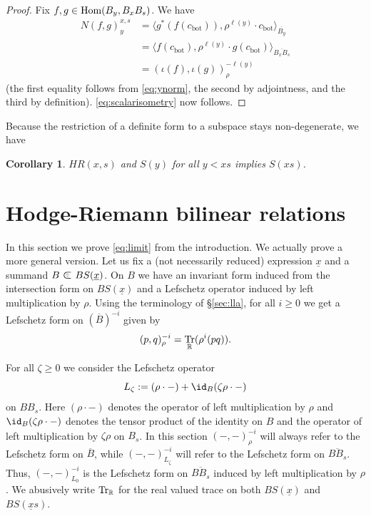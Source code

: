 \documentclass[11pt]{amsart}
\numberwithin{equation}{section}
\def\z{\zeta}
\def\bot{{\mathrm{bot}}}
\DeclareMathOperator{\Tr}{Tr}
\def\ov{\overline}
\def\un{\underline}
\def\summand{
\mathbin{\tikz [baseline=-3pt]
{
\clip (-0.2,-0.15) rectangle (0.2,0.15);
\node[scale=1.2] at (0,0) {$\subset$}; \node[scale=0.5] at
  (0,0) {$\oplus$}; }}
}
\newtheorem{cor}[thm]{Corollary}
\theoremstyle{definition}
\theoremstyle{remark}
\begin{document}
\begin{proof}
Fix $f, g \in \operatorname{Hom}(B_y, B_xB_s)$. We have
\begin{align*}
N(f,g)_y^{x,s} & = \langle g^* ( f (c_\bot)), \rho^{\ell(y)} \cdot c_\bot \rangle_{\ov{B_y}} \\ & =
\langle f (c_\bot), \rho^{\ell(y)} \cdot  g(c_\bot) \rangle_{\ov{B_x B_s}} \\ & = (\iota(f), \iota(g))_\rho^{-\ell(y)} \end{align*} (the first equality follows from
\eqref{eq:ynorm}, the second by adjointness, and the third by
definition). \eqref{eq:scalarisometry} now follows.\end{proof}

Because the restriction of a definite form to a subspace stays non-degenerate, we have

\begin{cor} $HR(x,s)$ and $S(y)$ for all $y < xs$ implies $S(xs)$. \end{cor}




\section{Hodge-Riemann bilinear relations} \label{sec:HR}

In this section we prove \eqref{eq:limit} from the introduction. We actually prove a more general version. Let us fix a (not necessarily reduced) expression $\un{x}$ and a
summand $B \summand BS(\un{x})$. On $B$ we have an invariant form induced from the intersection form on $BS(\un{x})$ and a Lefschetz operator induced by left multiplication by $\rho$.
Using the terminology of \S\ref{sec:lla}, for all $i \ge 0$ we get a Lefschetz form on
$(\overline{B})^{-i}$ given by
\[ (p,q)^{-i}_\rho = \Tr_\RM(\rho^i (pq)). \]

For all $\z \ge 0$ we consider the Lefschetz operator \[ L_\z := ( \rho \cdot - ) + \id_{B} ( \z \rho \cdot -) \] on $BB_s$. Here $ ( \rho \cdot - )$ denotes the operator of left
multiplication by $\rho$ and $\id_{B} ( \z \rho \cdot -)$ denotes the tensor product of the identity on $B$ and the operator of left multiplication by $\z\rho$ on $B_s$. In
this section $(-,-)^{-i}_\rho$ will always refer to the Lefschetz form on $\ov{B}$, while $(-,-)^{-i}_{L_\z}$ will refer to the Lefschetz form on $\ov{BB_s}$. Thus, $(-,-)^{-i}_{L_0}$ is
the Lefschetz form on $\ov{BB_s}$ induced by left multiplication by $\rho$. We abusively write $\Tr_\RM$ for the real valued trace on both $BS(\un{x})$ and $BS(\un{x}s)$.
\end{document}
